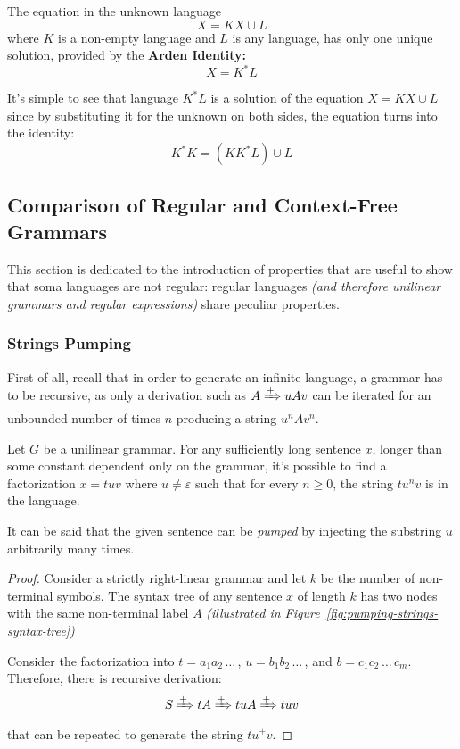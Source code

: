 \documentclass[english]{article}
\begin{document}
\begin{definition}
  \label{def:arden-identity}
  The equation in the unknown language \[ X= K X \cup L \] where \(K\) is a non-empty language and \(L\) is any language, has only one unique solution, provided by the \textbf{Arden Identity:}
  \[ X = K^\ast L \]
\end{definition}

It's simple to see that language \(K^\ast L\) is a solution of the equation \(X = K X \cup L\) since by substituting it for the unknown on both sides, the equation turns into the identity:
\[ K^\ast K = (K K^\ast L) \cup L \]

\subsection{Comparison of Regular and Context-Free Grammars}

This section is dedicated to the introduction of properties that are useful to show that soma languages are not regular:
regular languages \textit{(and therefore unilinear grammars and regular expressions)} share peculiar properties.

\subsubsection{Strings Pumping}

First of all, recall that in order to generate an infinite language, a grammar has to be recursive, as only a derivation such as \(A \xRightarrow{+} u A v\) can be iterated for an unbounded number of times \(n\) producing a string \(u^n A v^n\).

\begin{theorem}
  Let \(G\) be a unilinear grammar.
  For any sufficiently long sentence \(x\), longer than some constant dependent only on the grammar, it's possible to find a factorization \(x = tuv\) where \(u \neq \varepsilon\) such that for every \(n \geq 0\), the string \(t u^n v\) is in the language.
\end{theorem}

It can be said that the given sentence can be \textit{pumped} by injecting the substring \(u\) arbitrarily many times.

\begin{proof}
  Consider a strictly right-linear grammar and let \(k\) be the number of non-terminal symbols.
  The syntax tree of any sentence \(x\) of length \(k\) has two nodes with the same non-terminal label \(A\) \textit{(illustrated in Figure~\ref{fig:pumping-strings-syntax-tree})}

  Consider the factorization into \(t = a_1 a_2 \,\ldots\, \), \(u = b_1 b_2 \,\ldots\, \), and \(b = c_1 c_2 \,\ldots\, c_m\).
  Therefore, there is recursive derivation:
  \[S \xRightarrow{+} t A \xRightarrow{+} tuA \xRightarrow{+} tuv \]
  that can be repeated to generate the string \(tu^+ v\).
\end{proof}
\end{document}
